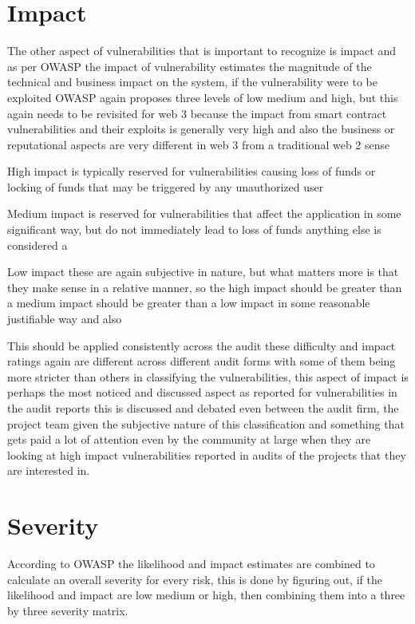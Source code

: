 \section{Impact}

The other aspect of vulnerabilities that is important to recognize is impact and as per OWASP the impact of vulnerability estimates the magnitude of the technical and business impact on the system, if the vulnerability were to be exploited OWASP again proposes three levels of low medium and high, but this again needs to be revisited for web 3 because the impact from smart contract vulnerabilities and their exploits is generally very high and also the business or reputational aspects are very different in web 3 from a traditional web 2 sense 

High impact is typically reserved for vulnerabilities causing loss of funds or locking of funds that may be triggered by any unauthorized user 

Medium impact is reserved for vulnerabilities that affect the application in some significant way, but do not immediately lead to loss of funds anything else is considered a 

Low impact these are again subjective in nature, but what matters more is that they make sense in a relative manner, so the high impact should be greater than a medium impact should be greater than a low impact in some reasonable justifiable way and also

This should be applied consistently across the audit these difficulty and impact ratings again are different across different audit forms with some of them being more stricter than others in classifying the vulnerabilities, this aspect of impact is perhaps the most noticed and discussed aspect as reported for vulnerabilities in the audit reports this is discussed and debated even between the audit firm, the project team given the subjective nature of this classification and something that gets paid a lot of attention even by the community at large when they are looking at high impact vulnerabilities reported in audits of the projects that they are interested in.

\section{Severity}

According to OWASP the likelihood and impact estimates are combined to calculate an overall severity for every risk, this is done by figuring out, if the likelihood and impact are low medium or high, then combining them into a three by three severity matrix. 

